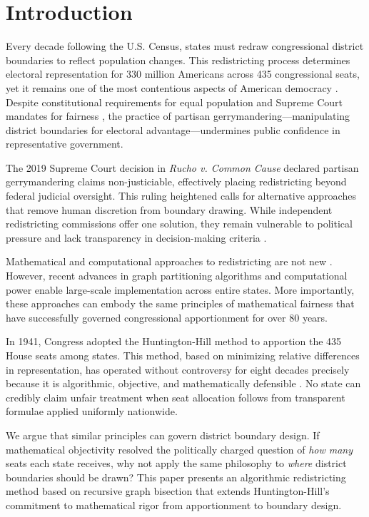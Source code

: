 \section{Introduction}

Every decade following the U.S. Census, states must redraw congressional district boundaries to reflect population changes. This redistricting process determines electoral representation for 330 million Americans across 435 congressional seats, yet it remains one of the most contentious aspects of American democracy \cite{daley2021unrigging}. Despite constitutional requirements for equal population and Supreme Court mandates for fairness \cite{reynolds1964,shaw1993}, the practice of partisan gerrymandering—manipulating district boundaries for electoral advantage—undermines public confidence in representative government.

The 2019 Supreme Court decision in \textit{Rucho v. Common Cause} \cite{rucho2019} declared partisan gerrymandering claims non-justiciable, effectively placing redistricting beyond federal judicial oversight. This ruling heightened calls for alternative approaches that remove human discretion from boundary drawing. While independent redistricting commissions offer one solution, they remain vulnerable to political pressure and lack transparency in decision-making criteria \cite{stephanopoulos2015partisan}.

Mathematical and computational approaches to redistricting are not new \cite{hess1965nonpartisan,garfinkel1970optimal}. However, recent advances in graph partitioning algorithms and computational power enable large-scale implementation across entire states. More importantly, these approaches can embody the same principles of mathematical fairness that have successfully governed congressional apportionment for over 80 years.

In 1941, Congress adopted the Huntington-Hill method \cite{huntington1928method} to apportion the 435 House seats among states. This method, based on minimizing relative differences in representation, has operated without controversy for eight decades precisely because it is algorithmic, objective, and mathematically defensible \cite{balinski1982fair}. No state can credibly claim unfair treatment when seat allocation follows from transparent formulae applied uniformly nationwide.

We argue that similar principles can govern district boundary design. If mathematical objectivity resolved the politically charged question of \textit{how many} seats each state receives, why not apply the same philosophy to \textit{where} district boundaries should be drawn? This paper presents an algorithmic redistricting method based on recursive graph bisection that extends Huntington-Hill's commitment to mathematical rigor from apportionment to boundary design.

